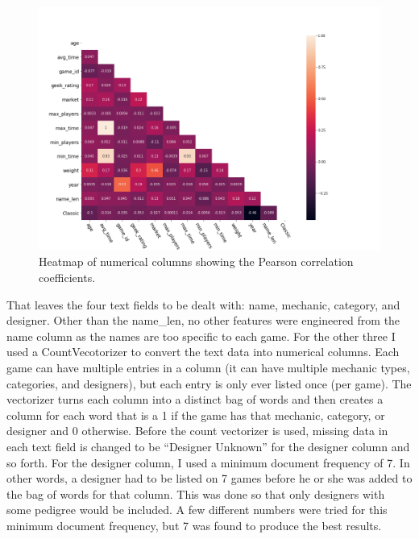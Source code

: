 \documentclass[12pt]{article}
\begin{document}
\begin{figure}[ht]
\includegraphics[width=20cm]{ranked_df_heatmap.png}
\caption{\small Heatmap of numerical columns showing the Pearson correlation coefficients.}
\end{figure}


That leaves the four text fields to be dealt with: name, mechanic, category, and designer. Other than the name\_len, no other features were engineered from the name column as the names are too specific to each game. For the other three I used a CountVecotorizer to convert the text data into numerical columns. Each game can have multiple entries in a column (it can have multiple mechanic types, categories, and designers), but each entry is only ever listed once (per game).  The vectorizer turns each column into a distinct bag of words and then creates a column for each word that is a 1 if the game has that mechanic, category, or designer and 0 otherwise. Before the count vectorizer is used, missing data in each text field is changed to be ``Designer Unknown'' for the designer column and so forth. For the designer column, I used a minimum document frequency of 7. In other words, a designer had to be listed on 7 games before he or she was added to the bag of words for that column. This was done so that only designers with some pedigree would be included. A few different numbers were tried for this minimum document frequency, but 7 was found to produce the best results.
\end{document}
